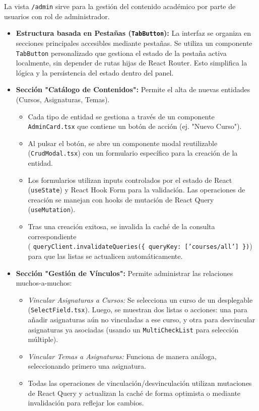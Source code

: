 La vista \texttt{/admin} sirve para la gestión del contenido académico por parte de usuarios con rol de administrador.
\begin{itemize}[leftmargin=*]
    \item \textbf{Estructura basada en Pestañas (\texttt{TabButton}):} La interfaz se organiza en secciones principales accesibles mediante pestañas. Se utiliza un componente \texttt{TabButton} personalizado que gestiona el estado de la pestaña activa localmente, sin depender de rutas hijas de React Router. Esto simplifica la lógica y la persistencia del estado dentro del panel.

    \item \textbf{Sección "Catálogo de Contenidos":} Permite el alta de nuevas entidades (Cursos, Asignaturas, Temas).
        \begin{itemize}
            \item Cada tipo de entidad se gestiona a través de un componente \texttt{AdminCard.tsx} que contiene un botón de acción (ej. "Nuevo Curso").
            \item Al pulsar el botón, se abre un componente modal reutilizable (\texttt{CrudModal.tsx}) con un formulario específico para la creación de la entidad.
            \item Los formularios utilizan inputs controlados por el estado de React (\texttt{useState}) y React Hook Form para la validación. Las operaciones de creación se manejan con hooks de mutación de React Query (\texttt{useMutation}).
            \item Tras una creación exitosa, se invalida la caché de la consulta correspondiente \\ ( \texttt{queryClient.invalidateQueries(\{ queryKey: ['courses/all'] \})}) para que las listas se actualicen automáticamente.
        \end{itemize}

    \item \textbf{Sección "Gestión de Vínculos":} Permite administrar las relaciones muchos-a-muchos:
        \begin{itemize}
          \item \textit{Vincular Asignaturas a Cursos:} Se selecciona un curso de un desplegable (\texttt{SelectField.tsx}). Luego, se muestran dos listas o acciones: una para añadir asignaturas aún no vinculadas a ese curso, y otra para desvincular asignaturas ya asociadas (usando un \texttt{MultiCheckList} para selección múltiple).
          \item \textit{Vincular Temas a Asignaturas:} Funciona de manera análoga, seleccionando primero una asignatura.
          \item Todas las operaciones de vinculación/desvinculación utilizan mutaciones de React Query y actualizan la caché de forma optimista o mediante invalidación para reflejar los cambios.
        \end{itemize}


\end{itemize}
